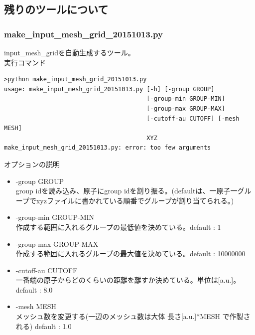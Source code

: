 \documentclass{jsarticle}
\begin{document}
\subsection{残りのツールについて}

\subsubsection{make\_input\_mesh\_grid\_20151013.py}
input\_mesh\_gridを自動生成するツール。\\

実行コマンド
\begin{Verbatim}[frame=single]
>python make_input_mesh_grid_20151013.py
usage: make_input_mesh_grid_20151013.py [-h] [-group GROUP]
                                        [-group-min GROUP-MIN]
                                        [-group-max GROUP-MAX]
                                        [-cutoff-au CUTOFF] [-mesh MESH]
                                        XYZ
make_input_mesh_grid_20151013.py: error: too few arguments
\end{Verbatim}

オプションの説明
\begin{itemize}
\item -group GROUP\\
group idを読み込み、原子にgroup idを割り振る。(defaultは、一原子一グループでxyzファイルに書かれている順番でグループが割り当てられる。)
\item -group-min GROUP-MIN\\
作成する範囲に入れるグループの最低値を決めている。default : 1
\item -group-max GROUP-MAX\\
作成する範囲に入れるグループの最大値を決めている。default : 10000000
\item -cutoff-au CUTOFF\\
一番端の原子からどのくらいの距離を離すか決めている。単位は[a.u.]。default : 8.0
\item -mesh MESH\\
メッシュ数を変更する(一辺のメッシュ数は大体 長さ[a.u.]*MESH で作製される) default : 1.0\\
\end{itemize}
\end{document}
